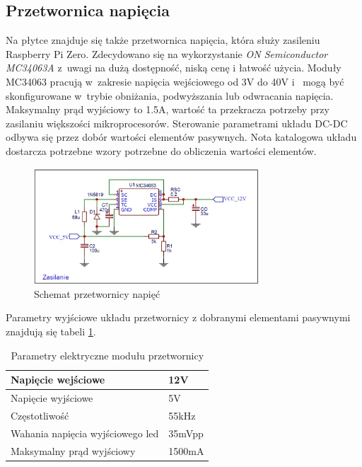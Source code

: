 \documentclass[12pt, eng, twoside, openany, final]{mgr}
\begin{document}
        \subsection{Przetwornica napięcia}
        Na płytce znajduje się także przetwornica napięcia, która służy zasileniu Raspberry Pi Zero. Zdecydowano się na wykorzystanie \emph{ON Semiconductor MC34063A} z~uwagi na dużą dostępność, niską cenę i łatwość użycia. Moduły MC34063 pracują w~zakresie napięcia wejściowego od 3V do 40V i~ mogą być skonfigurowane w~trybie obniżania, podwyższania lub odwracania napięcia. Maksymalny prąd wyjściowy to 1.5A, wartość ta przekracza potrzeby przy zasilaniu większości mikroprocesorów. Sterowanie parametrami układu DC-DC odbywa się przez dobór wartości elementów pasywnych. Nota katalogowa\cite{mc34063A} układu dostarcza potrzebne wzory potrzebne do obliczenia wartości elementów.
                \begin{figure}[H]
                \begin{center}
                    \includegraphics[width=0.75\textwidth]{zasilanie.jpg}
                    \caption{Schemat przetwornicy napięć}
                \end{center}
                \end{figure}
                
\noindent        Parametry wyjściowe układu przetwornicy z dobranymi elementami pasywnymi znajdują się tabeli \ref{tab:przet}.
             \begin{table}[H]
        \centering
        \begin{tabular}{ | m{15em} | m{3cm}| } 
        \hline
        Napięcie wejściowe & 12V \\ 
        \hline
        Napięcie wyjściowe & 5V \\ 
        \hline
        Częstotliwość  &55kHz\\
        \hline
        Wahania napięcia wyjściowego led &35mVpp\\
        \hline
        Maksymalny prąd wyjściowy &1500mA\\
        \hline
        \end{tabular}
        \caption{Parametry elektryczne modułu przetwornicy}
        \label{tab:przet}
        \end{table}
        
\end{document}
